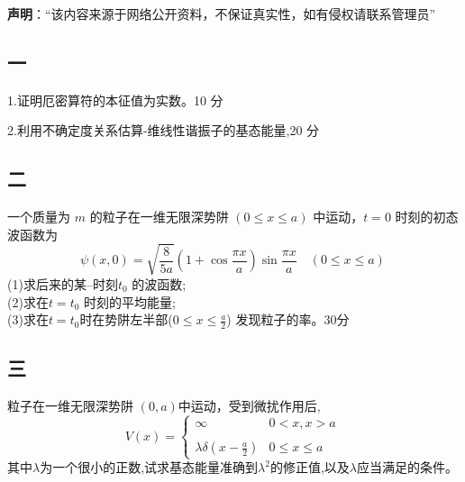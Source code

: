 
\textbf{声明}：“该内容来源于网络公开资料，不保证真实性，如有侵权请联系管理员”

\subsection{一}
1.证明厄密算符的本征值为实数。10 分

2.利用不确定度关系估算-维线性谐振子的基态能量,20 分

\subsection{二}
一个质量为 $m$ 的粒子在一维无限深势阱 $ (0 \leq x \leq a) $ 中运动，$t = 0$ 时刻的初态波函数为
$$\psi(x, 0) = \sqrt{\frac{8}{5a}} (1 + \cos \frac{\pi x}{a}) \sin \frac{\pi x}{a} \quad (0 \leq x \leq a)~$$ 
(1)求后来的某--时刻$t_0$ 的波函数;\\
(2)求在$t=t_0$ 时刻的平均能量;\\
(3)求在$t=t_0$时在势阱左半部($0\leq  x \leq \frac{a}{2}$) 发现粒子的率。30分

\subsection{三}
粒子在一维无限深势阱 $(0,a)$中运动，受到微扰作用后,
$$V(x) = \begin{cases} \infty & 0 < x, x > a \\\\ \lambda \delta \left( x - \frac{a}{2} \right) & 0 \leq x \leq a \end{cases}~$$
其中$\lambda$为一个很小的正数,试求基态能量准确到$\lambda^2$的修正值,以及$\lambda$应当满足的条件。

\subsection{}